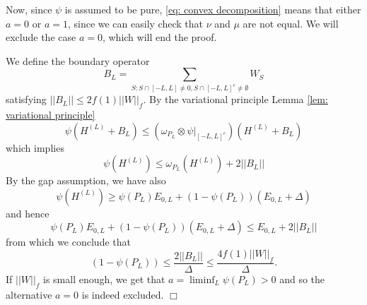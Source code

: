 Now, since $\psi$ is assumed to be pure, \eqref{eq: convex decomposition} means that either $a=0$ or $a=1$, since we can easily check that $\nu$ and $\mu$ are not equal. We will exclude the case $a=0$, which will end the proof.  

We define the boundary operator
$$
B_L= \sum_{S: S \cap [-L,L]\neq 0, S \cap [-L,L]^c \neq \emptyset}  W_S
$$
satisfying $||B_L|| \leq 2f(1) ||W||_f$. By the variational principle Lemma \ref{lem: variational principle}
$$
\psi(H^{(L)}+B_L) \leq (\omega_{P_L}\otimes\psi|_{[-L,L]^c})(H^{(L)}+B_L)
$$
which implies 
$$
\psi(H^{(L)}) \leq \omega_{P_L}(H^{(L)}) + 2||B_L||  
$$
By the gap assumption, we have 
also
$$
\psi(H^{(L)}) \geq \psi(P_L) E_{0,L}+ (1-\psi(P_L)) (E_{0,L} +\Delta)    
$$
and hence
$$
\psi(P_L) E_{0,L}+ (1-\psi(P_L)) (E_{0,L} +\Delta) \leq  E_{0,L} + 2||B_L|| 
$$
from which we conclude that
$$
(1-\psi(P_L))   \leq  \frac{2||B_L|| }{\Delta} \leq  \frac{4 f(1) ||W||_f  }{\Delta}.
$$
If $||W||_f$ is small enough, we get that $a = \liminf_L\psi(P_L)>0$ and so the alternative $a=0$ is indeed excluded. \hfill $\Box$

\cleardoublepage


